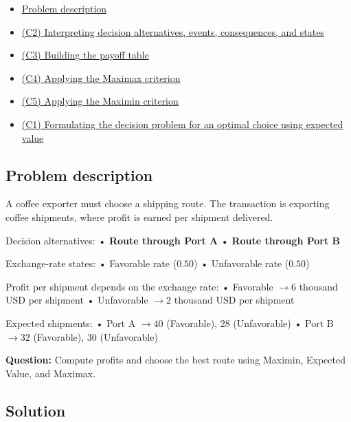 \documentclass[11pt]{article}
\begin{document}
	\begin{itemize}
		\item \hyperlink{problem6-problem}{Problem description}
		\item \hyperlink{problem6-c2}{(C2) Interpreting decision alternatives, events, consequences, and states}
		\item \hyperlink{problem6-c3}{(C3) Building the payoff table}
		\item \hyperlink{problem6-c4}{(C4) Applying the Maximax criterion}
		\item \hyperlink{problem6-c5}{(C5) Applying the Maximin criterion}
		\item \hyperlink{problem6-c1}{(C1) Formulating the decision problem for an optimal choice using expected value}
	\end{itemize}
	
	
	\subsection*{Problem description}
	
	\hypertarget{problem6-problem}{}
	
	A coffee exporter must choose a shipping route. The transaction is exporting coffee shipments, where profit is earned
	per shipment delivered.
	
	
	
	
	
	
	Decision alternatives:
	• \textbf{Route through Port A}
	• \textbf{Route through Port B}
	
	
	
	
	Exchange-rate states:
	• Favorable rate ($0.50$)
	• Unfavorable rate ($0.50$)
	
	
	
	
	
	
	Profit per shipment depends on the exchange rate:
	• Favorable $\to 6$ thousand USD per shipment
	• Unfavorable $\to 2$ thousand USD per shipment
	
	
	
	
	
	
	Expected shipments:
	• Port A $\to 40$ (Favorable), $28$ (Unfavorable)
	• Port B $\to 32$ (Favorable), $30$ (Unfavorable)
	
	
	
	
	
	\textbf{Question:} Compute profits and choose the best route using Maximin, Expected Value, and Maximax.
	
	\subsection*{Solution}
	
\end{document}
